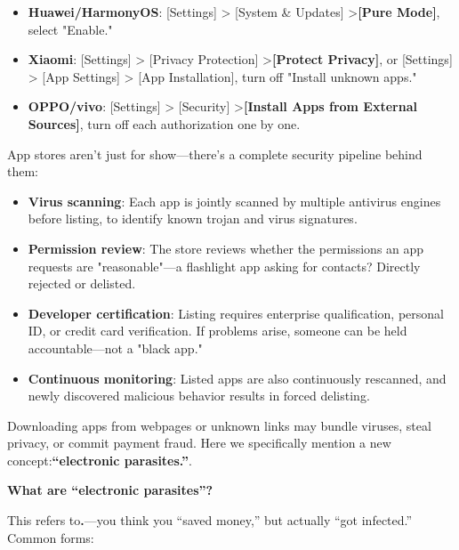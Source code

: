 
\begin{itemize}
  \item \textbf{Huawei/HarmonyOS}: [Settings] > [System \& Updates] >\textbf{[Pure Mode]}, select "Enable."
  \item \textbf{Xiaomi}: [Settings] > [Privacy Protection] >\textbf{[Protect Privacy]}, or [Settings] > [App Settings] > [App Installation], turn off "Install unknown apps."
  \item \textbf{OPPO/vivo}: [Settings] > [Security] >\textbf{[Install Apps from External Sources]}, turn off each authorization one by one.
\end{itemize}


App stores aren't just for show—there's a complete security pipeline behind them:

\begin{itemize}
  \item \textbf{Virus scanning}: Each app is jointly scanned by multiple antivirus engines before listing, to identify known trojan and virus signatures.
  \item \textbf{Permission review}: The store reviews whether the permissions an app requests are "reasonable"—a flashlight app asking for contacts? Directly rejected or delisted.
  \item \textbf{Developer certification}: Listing requires enterprise qualification, personal ID, or credit card verification. If problems arise, someone can be held accountable—not a "black app."
  \item \textbf{Continuous monitoring}: Listed apps are also continuously rescanned, and newly discovered malicious behavior results in forced delisting.
\end{itemize}


Downloading apps from webpages or unknown links may bundle viruses, steal privacy, or commit payment fraud. Here we specifically mention a new concept:\textbf{“electronic parasites.”}.

\textbf{What are “electronic parasites”?}\par

This refers to\textbf{.}—you think you “saved money,” but actually “got infected.” Common forms:

